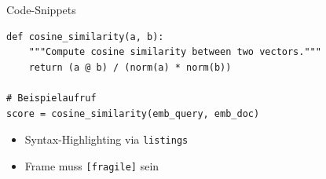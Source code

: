 \begin{frame}[fragile]{Code-Snippets}
\begin{lstlisting}
def cosine_similarity(a, b):
    """Compute cosine similarity between two vectors."""
    return (a @ b) / (norm(a) * norm(b))

# Beispielaufruf
score = cosine_similarity(emb_query, emb_doc)
\end{lstlisting}

  \begin{itemize}
    \item Syntax-Highlighting via \texttt{listings}
    \item Frame muss \texttt{[fragile]} sein
  \end{itemize}
\end{frame}